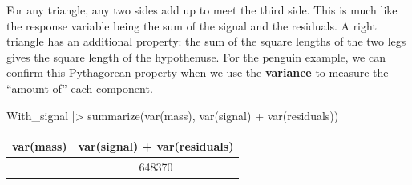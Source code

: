 \documentclass[
  letterpaper,
  DIV=11,
  numbers=noendperiod,
  oneside]{scrartcl}
\newenvironment{Shaded}{\begin{snugshade}}{\end{snugshade}}
\newcommand{\FunctionTok}[1]{\textcolor[rgb]{0.28,0.35,0.67}{#1}}
\newcommand{\NormalTok}[1]{\textcolor[rgb]{0.00,0.23,0.31}{#1}}
\newcommand{\SpecialCharTok}[1]{\textcolor[rgb]{0.37,0.37,0.37}{#1}}
\begin{document}
For any triangle, any two sides add up to meet the third side. This is
much like the response variable being the sum of the signal and the
residuals. A right triangle has an additional property: the sum of the
square lengths of the two legs gives the square length of the
hypothenuse. For the penguin example, we can confirm this Pythagorean
property when we use the \textbf{variance} to measure the ``amount of''
each component.

\begin{Shaded}
\begin{Highlighting}[]
\NormalTok{With\_signal }\SpecialCharTok{|\textgreater{}}
  \FunctionTok{summarize}\NormalTok{(}\FunctionTok{var}\NormalTok{(mass), }
            \FunctionTok{var}\NormalTok{(signal) }\SpecialCharTok{+} \FunctionTok{var}\NormalTok{(residuals))}
\end{Highlighting}
\end{Shaded}

\begin{longtable}[]{@{}cc@{}}
\toprule\noalign{}
var(mass) & var(signal) + var(residuals) \\
\midrule\noalign{}
\endhead
\bottomrule\noalign{}
\endlastfoot
648370 & 648370 \\
\end{longtable}
\end{document}
